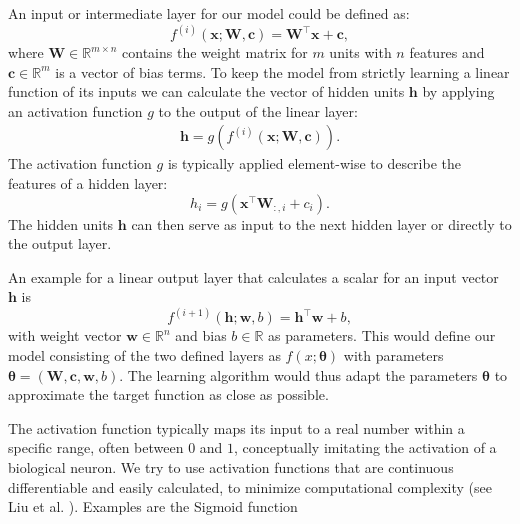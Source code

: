 An input or intermediate layer for our model could be defined as:
\begin{equation}
    f^{(i)}(\mathbf{x}; \mathbf{W},\mathbf{c})=\mathbf{W}^\top\mathbf{x}+\mathbf{c},
\end{equation}
where $\mathbf{W} \in \mathbb{R}^{m\times n}$ contains the weight matrix for $m$ units with $n$ features and $\mathbf{c}\in \mathbb{R}^m$ is a vector of bias terms.
To keep the model from strictly learning a linear function of its inputs we can calculate the vector of hidden units $\mathbf{h}$ by applying an activation function $g$ to the output of the linear layer:
\begin{align}
    \mathbf{h} = g(f^{(i)}(\mathbf{x}; \mathbf{W},\mathbf{c})).
\end{align}
The activation function $g$ is typically applied element-wise to describe the features of a hidden layer:
\begin{equation}
    h_i = g(\mathbf{x}^\top\mathbf{W}_{:,i}+c_i).
\end{equation}
The hidden units $\mathbf{h}$ can then serve as input to the next hidden layer or directly to the output layer.

An example for a linear output layer that calculates a scalar for an input vector $\mathbf{h}$ is
\begin{equation}
    f^{(i+1)}(\mathbf{h}; \mathbf{w},b)=\mathbf{h}^\top\mathbf{w}+b,
\end{equation}
with weight vector $\mathbf{w} \in \mathbb{R}^n$ and bias $b \in \mathbb{R}$ as parameters. This would define our model consisting of the two defined layers as $f(x;\boldsymbol{\theta})$ with parameters $\boldsymbol{\theta} = (\mathbf{W}, \mathbf{c}, \mathbf{w}, b)$. The learning algorithm would thus adapt the parameters $\boldsymbol{\theta}$ to approximate the target function as close as possible.

The activation function typically maps its input to a real number within a specific range, often between $0$ and $1$, conceptually imitating the activation of a biological neuron. We try to use activation functions that are continuous differentiable and easily calculated, to minimize computational complexity (see Liu et al. \cite{Liu2020}). Examples are the Sigmoid function

